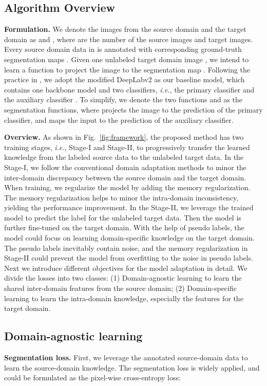 \documentclass{article}
\def\ie{\emph{i.e.}}
\begin{document}
\subsection{Algorithm Overview}
\noindent\textbf{Formulation.} We denote the images from the source domain and the target domain as  and , where  are the number of the source images and target images. Every source domain data in  is annotated with corresponding ground-truth segmentation maps . 
Given one unlabeled target domain image , we intend to learn a function to project the image to the segmentation map . 
Following the practice in \cite{tsai2018learning,luo2019taking}, we adopt the modified DeepLabv2 as our baseline model, which contains one backbone model and two classifiers, \ie, the primary classifier  and the auxiliary classifier . To simplify, we denote the two functions  and  as the segmentation functions, where  projects the image to the prediction of the primary classifier, and  maps the input to the prediction of the auxiliary classifier.

\noindent\textbf{Overview.} As shown in Fig.~\ref{fig:framework}, the proposed method has two training stages, \ie, Stage-I and Stage-II, to progressively transfer the learned knowledge from the labeled source data to the unlabeled target data. In the Stage-I, we follow the conventional domain adaptation methods to minor the inter-domain discrepancy between the source domain and the target domain. When training, we regularize the model by adding the memory regularization. The memory regularization helps to minor the intra-domain inconsistency, yielding the performance improvement. 
In the Stage-II, we leverage the trained model to predict the label for the unlabeled target data. Then the model is further fine-tuned on the target domain. With the help of pseudo labels, the model could focus on learning domain-specific knowledge on the target domain. The pseudo labels inevitably contain noise, and the memory regularization in Stage-II could prevent the model from overfitting to the noise in pseudo labels. 
Next we introduce different objectives for the model adaptation in detail. We divide the losses into two classes: (1) Domain-agnostic learning to learn the shared inter-domain features from the source domain; (2) Domain-specific learning to learn the intra-domain knowledge, especially the features for the target domain.

\subsection{Domain-agnostic learning}
\noindent\textbf{Segmentation loss.} 
First, we leverage the annotated source-domain data to learn the source-domain knowledge. The segmentation loss is widely applied, and could be formulated as the pixel-wise cross-entropy loss: 
\end{document}
